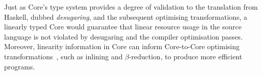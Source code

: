\documentclass[acmsmall,review,screen]{acmart}
\begin{document}

Just as Core's type system \cite{10.1145/1190315.1190324} provides a
degree of validation to the 
translation from Haskell, dubbed \emph{desugaring}, and the subsequent
optimising transformations, a linearly typed Core would guarantee that
linear resource usage in the source language is not violated by desugaring
and the compiler optimisation passes. Moreover, linearity information in
Core can inform Core-to-Core optimising 
transformations~\cite{cite:let-floating,peytonjones1997a,cite:linearhaskell},
such as inlining and $\beta$-reduction, to produce more efficient programs.
%
%
%
%
\end{document}

